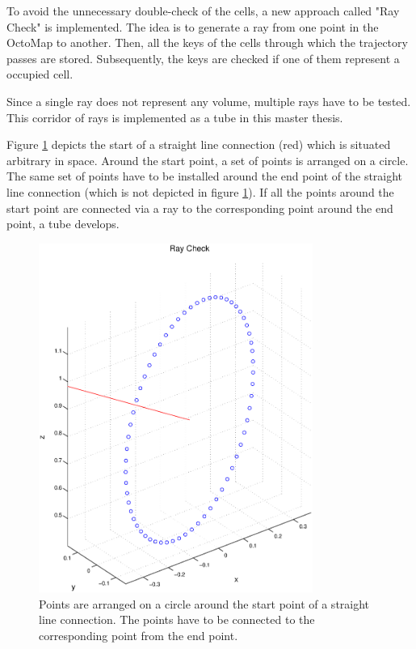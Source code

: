 To avoid the unnecessary double-check of the cells, a new approach called "Ray Check" is implemented. The idea is to generate a ray from one point in the OctoMap to another. Then, all the keys of the cells through which the trajectory passes are stored. Subsequently, the keys are checked if one of them represent a occupied cell. \newpage

Since a single ray does not represent any volume, multiple rays have to be tested. This corridor of rays is implemented as a tube in this master thesis.\newline

Figure \ref{pic:RayCheck} depicts the start of a straight line connection (red) which is situated arbitrary in space. Around the start point, a set of points is arranged on a circle. The same set of points have to be installed around the end point of the straight line connection (which is not depicted in figure \ref{pic:RayCheck}). If all the points around the start point are connected via a ray to the corresponding point around the end point, a tube develops.




\begin{figure}[h]
   \centering
   \includegraphics[trim = 25mm 10mm 30mm 10mm,clip,width=0.8\textwidth]{pics/RayCheck.eps}
   \caption{Points are arranged on a circle around the start point of a straight line connection. The points have to be connected to the corresponding point from the end point.}
   \label{pic:RayCheck}
\end{figure}

